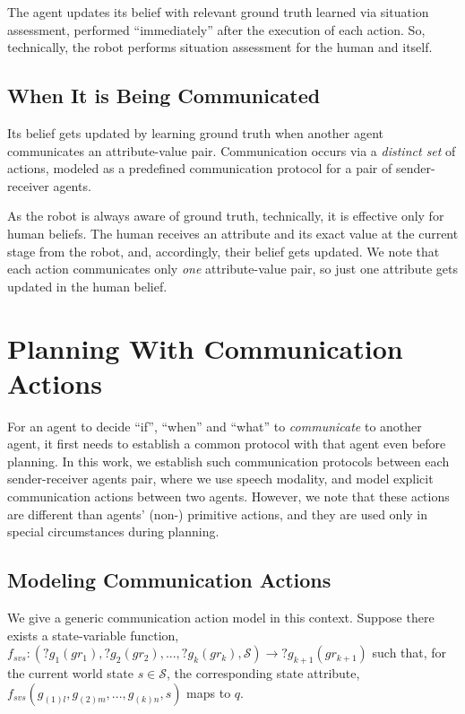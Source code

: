 \documentclass[letterpaper]{article} %
\begin{document}
The agent updates its belief with relevant ground truth learned via situation assessment, performed ``immediately'' after the execution of each action. So, technically, the robot performs situation assessment for the human and itself.

\subsection{When It is Being Communicated}
Its belief gets updated by learning ground truth when another agent communicates an attribute-value pair. Communication occurs via a \textit{distinct set} of actions, modeled as a predefined communication protocol for a pair of sender-receiver agents. 

As the robot is always aware of ground truth, technically, it is effective only for human beliefs.
The human receives an attribute and its exact value at the current stage from the robot, and, accordingly, their belief gets updated. 
We note that each action communicates only {\em one} attribute-value pair, so just one attribute gets updated in the human belief.


\section{Planning With Communication Actions}
For an agent to decide ``if'', ``when'' and ``what'' to \textit{communicate} to another agent, it first needs to establish a common protocol with that agent even before planning.  
In this work, we establish such communication protocols between each sender-receiver agents pair, where we use speech modality, and model explicit communication actions between two agents. 
However, we note that these actions are different than agents' (non-) primitive actions, and they are used only in special circumstances during planning.

\subsection{Modeling Communication Actions} 
We give a generic communication action model in this context. 
% 
Suppose there exists a state-variable function, $f_{svs}:(?g_1 (gr_1), ?g_2 (gr_2), ..., ?g_k (gr_k),\mathcal{S}) \rightarrow ?g_{k+1} (gr_{k+1})$ such that,
for the current world state $s \in \mathcal{S}$, the corresponding state attribute, $f_{\textit{svs}}(g_{(1)l},g_{(2)m},...,g_{(k)n},s)$ maps to $q$.
\end{document}
